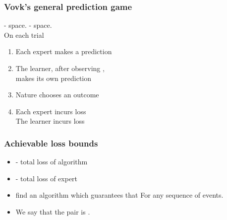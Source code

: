 \documentclass[handout]{beamer}
\begin{document}
\begin{frame}
\frametitle{Vovk's general prediction game}
\R{$\Gamma$} -  space.
\R{$\Omega$} -  space. \\
\pause
On each trial 
\pause
\begin{enumerate}
\item
Each expert  makes a prediction 
\item
The learner, after observing , \\
makes its own prediction 
\item
Nature chooses an outcome 
\item
Each expert incurs loss  \\
The learner incurs loss 
\end{enumerate}
\end{frame}

\begin{frame}
\frametitle{Achievable loss bounds}
\begin{itemize}
\item {} - total loss of algorithm
\item {} - total loss of expert 
\item {} find an algorithm which guarantees that 
\R{\[
(a,c) \in [0,\infty),\;\; \TAloss \leq a \BEloss + c \ln N 
\]}
For any sequence of events.
\item We say that the pair  is .
\end{itemize}
\end{frame}
\end{document}
